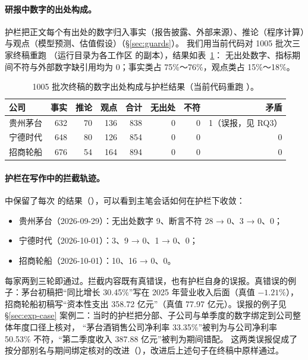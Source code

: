 \paragraph{研报中数字的出处构成。}护栏把正文每个有出处的数字归入事实（报告披露、外部来源）、推论（程序计算）与观点（模型预测、估值假设）（\S\ref{sec:guards}）。
我们用当前代码对 1005 批次三家终稿重跑 （运行目录为各工作区  的副本），结果如表~\ref{tab:exp-provenance}：
无出处数字、指标期间不符与外部数字缺引用均为 0；事实类占 75\%～76\%，观点类占 15\%～18\%。

\begin{table}[t]
\centering
\caption{1005 批次终稿的数字出处构成与护栏结果（当前代码重跑 ）。}
\label{tab:exp-provenance}
\small
\begin{tabular}{@{}lrrrrrrr@{}}
\toprule
公司 & 事实 & 推论 & 观点 & 合计 & 无出处 & 不符 & 矛盾 \\
\midrule
贵州茅台 & 632 & 70 & 136 & 838 & 0 & 0 & 1（误报，见 RQ3） \\
宁德时代 & 648 & 80 & 126 & 854 & 0 & 0 & 0 \\
招商轮船 & 676 & 54 & 164 & 894 & 0 & 0 & 0 \\
\bottomrule
\end{tabular}
\end{table}

\paragraph{护栏在写作中的拦截轨迹。} 中保留了每次  的结果（），可以看到主笔会话如何在护栏下收敛：
\begin{itemize}
  \item 贵州茅台（2026-09-29）：无出处数字 9、断言不符 28 → 0、3 → 0、0；
  \item 宁德时代（2026-10-01）：3、9 → 0、1 → 0、0；
  \item 招商轮船（2026-10-01）：10、16 → 0、0。
\end{itemize}
每家两到三轮即通过。拦截内容既有真错误，也有护栏自身的误报。真错误的例子：茅台初稿把“同比增长 30.45\%”写在 2025 年营业收入后面（真值 $-1.21\%$），
招商轮船初稿写“资本性支出 358.72 亿元”（真值 77.97 亿元）。误报的例子见 \S\ref{sec:exp-case} 案例二：当时的护栏把分部、子公司与单季度的数字绑定到公司整体年度口径上核对，
“茅台酒销售公司净利率 33.35\%”被判为与公司净利率 50.53\% 不符，“第二季度收入 387.88 亿元”被判为期间错配。
这两类误报促成了按分部别名与期间绑定核对的改进（），改进后上述句子在终稿中原样通过。

